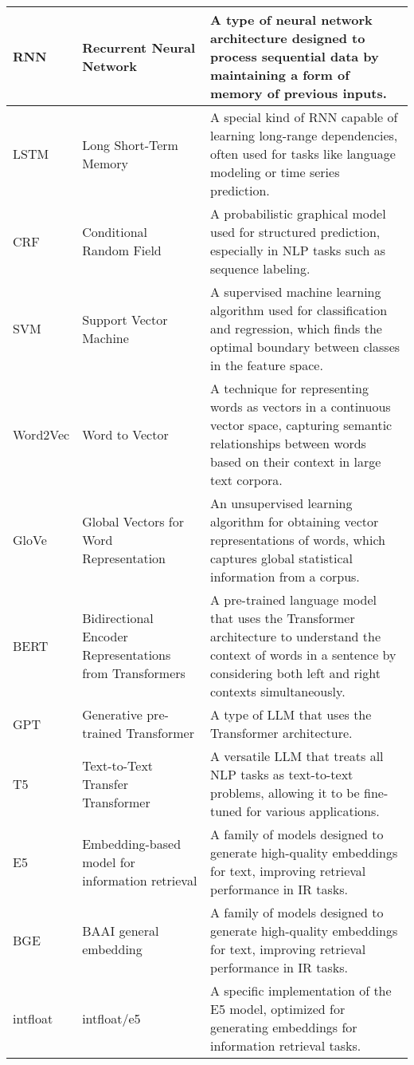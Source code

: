 \begin{tabularx}{\textwidth}{
  >{\raggedright\arraybackslash}p{2.5cm}
  >{\raggedright\arraybackslash}p{4cm}
  >{\noindent\justifying\arraybackslash}X
}
\cmidrule(lr){1-3}
RNN   & Recurrent Neural Network & A type of neural network architecture designed to process sequential data by maintaining a form of memory of previous inputs. \\
\cmidrule(lr){1-3}
LSTM  & Long Short-Term Memory & A special kind of RNN capable of learning long-range dependencies, often used for tasks like language modeling or time series prediction. \\
\cmidrule(lr){1-3}
CRF   & Conditional Random Field & A probabilistic graphical model used for structured prediction, especially in NLP tasks such as sequence labeling. \\
\cmidrule(lr){1-3}
SVM   & Support Vector Machine & A supervised machine learning algorithm used for classification and regression, which finds the optimal boundary between classes in the feature space. \\
\cmidrule(lr){1-3}
Word2Vec & Word to Vector & A technique for representing words as vectors in a continuous vector space, capturing semantic relationships between words based on their context in large text corpora. \\
\cmidrule(lr){1-3}
GloVe  & Global Vectors for Word Representation & An unsupervised learning algorithm for obtaining vector representations of words, which captures global statistical information from a corpus. \\
\cmidrule(lr){1-3}
BERT  & Bidirectional Encoder Representations from Transformers & A pre-trained language model that uses the Transformer architecture to understand the context of words in a sentence by considering both left and right contexts simultaneously. \\
\cmidrule(lr){1-3}
GPT   & Generative pre-trained Transformer & A type of LLM that uses the Transformer architecture.\\
\cmidrule(lr){1-3}
T5    & Text-to-Text Transfer Transformer & A versatile LLM that treats all NLP tasks as text-to-text problems, allowing it to be fine-tuned for various applications. \\
\cmidrule(lr){1-3}
E5    & Embedding-based model for information retrieval & A family of models designed to generate high-quality embeddings for text, improving retrieval performance in IR tasks. \\
\cmidrule(lr){1-3}
BGE   & BAAI general embedding & A family of models designed to generate high-quality embeddings for text, improving retrieval performance in IR tasks. \\
\cmidrule(lr){1-3}
intfloat & intfloat/e5 & A specific implementation of the E5 model, optimized for generating embeddings for information retrieval tasks. \\

\end{tabularx}
